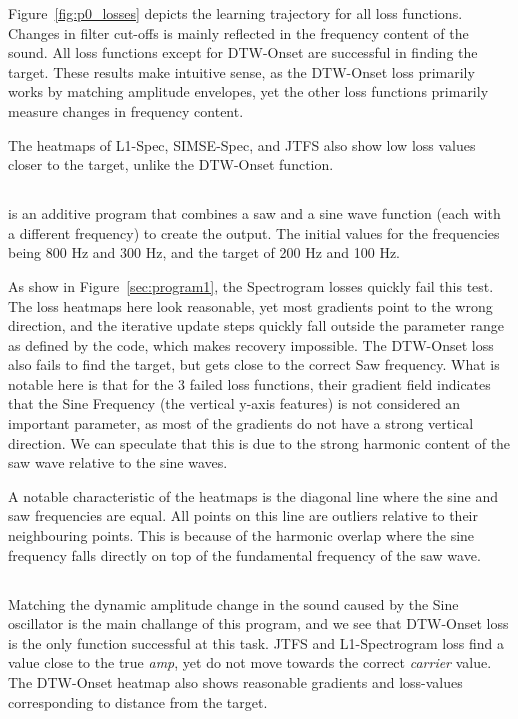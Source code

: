 Figure~\ref{fig:p0_losses} depicts the learning trajectory for all loss functions. Changes in filter cut-offs is mainly reflected in the frequency content of the sound.  All loss functions except for DTW-Onset are successful in finding the target. These results make intuitive sense, as the DTW-Onset loss primarily works by matching amplitude envelopes, yet the other loss functions primarily measure changes in frequency content. 

The heatmaps of L1-Spec, SIMSE-Spec, and JTFS also show low loss values closer to the target, unlike the DTW-Onset function.  

\subsection{\AddSineSaw}
\AddSineSaw{} is an additive program that combines a saw and a sine wave function (each with a different frequency) to create the output. The initial values for the frequencies being 800 Hz and 300 Hz, and the target of 200 Hz and 100 Hz. 

As show in Figure~\ref{sec:program1}, the Spectrogram losses quickly fail this test. The loss heatmaps here look reasonable, yet most gradients point to the wrong direction, and the iterative update steps quickly fall outside the parameter range as defined by the code, which makes recovery impossible. The DTW-Onset loss also fails to find the target, but gets close to the correct Saw frequency. What is notable here is that for the 3 failed loss functions, their gradient field indicates that the Sine Frequency (the vertical y-axis features) is not considered an important parameter, as most of the gradients do not have a strong vertical direction. We can speculate that this is due to the strong harmonic content of the saw wave relative to the sine waves.

A notable characteristic of the heatmaps is the diagonal line where the sine and saw frequencies are equal. All points on this line are outliers relative to their neighbouring points. This is because of the harmonic overlap where the sine frequency falls directly on top of the fundamental frequency of the saw wave. 

\subsection{\AmpMod}
Matching the dynamic amplitude change in the sound caused by the Sine oscillator is the main challange of this program, and we see that DTW-Onset loss is the only function successful at this task. JTFS and L1-Spectrogram loss find a value close to the true \textit{amp}, yet do not move towards the correct \textit{carrier} value. The DTW-Onset heatmap also shows reasonable gradients and loss-values corresponding to distance from the target. 

